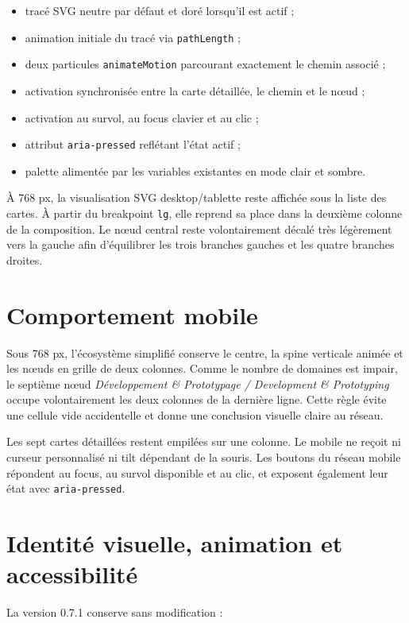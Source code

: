 \documentclass[11pt,a4paper]{article}
\newcommand{\tech}[1]{\texttt{#1}}
\begin{document}
\begin{itemize}
  \item tracé SVG neutre par défaut et doré lorsqu'il est actif ;
  \item animation initiale du tracé via \tech{pathLength} ;
  \item deux particules \tech{animateMotion} parcourant exactement le chemin associé ;
  \item activation synchronisée entre la carte détaillée, le chemin et le nœud ;
  \item activation au survol, au focus clavier et au clic ;
  \item attribut \tech{aria-pressed} reflétant l'état actif ;
  \item palette alimentée par les variables existantes en mode clair et sombre.
\end{itemize}

À 768 px, la visualisation SVG desktop/tablette reste affichée sous la liste des cartes. À partir
du breakpoint \tech{lg}, elle reprend sa place dans la deuxième colonne de la composition. Le
nœud central reste volontairement décalé très légèrement vers la gauche afin d'équilibrer les
trois branches gauches et les quatre branches droites.

\section{Comportement mobile}

Sous 768 px, l'écosystème simplifié conserve le centre, la spine verticale animée et les nœuds
en grille de deux colonnes. Comme le nombre de domaines est impair, le septième nœud
\emph{Développement \& Prototypage / Development \& Prototyping} occupe volontairement les
deux colonnes de la dernière ligne. Cette règle évite une cellule vide accidentelle et donne une
conclusion visuelle claire au réseau.

Les sept cartes détaillées restent empilées sur une colonne. Le mobile ne reçoit ni curseur
personnalisé ni tilt dépendant de la souris. Les boutons du réseau mobile répondent au focus, au
survol disponible et au clic, et exposent également leur état avec \tech{aria-pressed}.

\section{Identité visuelle, animation et accessibilité}

La version 0.7.1 conserve sans modification :
\end{document}
